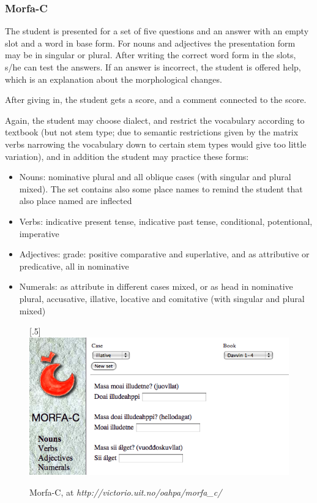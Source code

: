 \documentclass[a4paper,12pt]{article}
\begin{document}
\subsubsection{Morfa-C}
The student is presented for a set of five questions and an answer with an empty slot and a word in base form. For nouns and adjectives the presentation form may be in singular or plural. After writing the correct word form in the slots, s/he can test the answers. If an answer is incorrect, the student is offered help, which is an explanation about the morphological changes.

After giving in, the student gets a score, and a comment connected to the score. 

Again, the student may choose dialect, and restrict the vocabulary according to textbook (but not stem type; due to semantic restrictions given by the matrix verbs narrowing the vocabulary down to certain stem types would give too little variation), and in addition the student may practice these forms:
\begin{itemize}
\item Nouns: nominative plural and all oblique cases (with singular and plural mixed). The set contains also some place names to remind the student that also place named are inflected
\item Verbs: indicative present tense, indicative past tense, conditional, potentional, imperative
\item Adjectives: grade: positive comparative and superlative, and as attributive or predicative, all in nominative
\item Numerals: as attribute in different cases mixed, or as head in nominative plural, accusative, illative, locative and comitative (with singular and plural mixed)
\end{itemize}
\vspace{0.5cm}


\begin{figure}[htbp]
\begin{center}
\scalebox{.5}[.5]{\includegraphics{img/morfaC.png}}\\
\caption{Morfa-C, at \textit{http://victorio.uit.no/oahpa/morfa\_c/}}
\label{morfac}
\end{center}
\end{figure}
\end{document}

